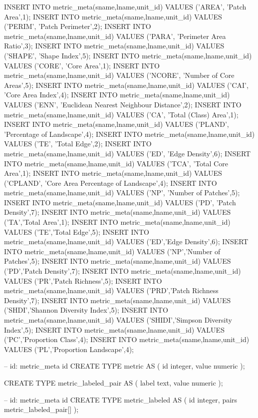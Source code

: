 \begin{SQL}
INSERT INTO metric_meta(sname,lname,unit_id) VALUES ('AREA', 'Patch Area',1);
INSERT INTO metric_meta(sname,lname,unit_id) VALUES ('PERIM', 'Patch Perimeter',2);
INSERT INTO metric_meta(sname,lname,unit_id) VALUES ('PARA', 'Perimeter Area Ratio',3);
INSERT INTO metric_meta(sname,lname,unit_id) VALUES ('SHAPE', 'Shape Index',5);
INSERT INTO metric_meta(sname,lname,unit_id) VALUES ('CORE', 'Core Area',1);
INSERT INTO metric_meta(sname,lname,unit_id) VALUES ('NCORE', 'Number of Core Areas',5);
INSERT INTO metric_meta(sname,lname,unit_id) VALUES ('CAI', 'Core Area Index',4);
INSERT INTO metric_meta(sname,lname,unit_id) VALUES ('ENN', 'Euclidean Nearest Neighbour Distance',2);
INSERT INTO metric_meta(sname,lname,unit_id) VALUES ('CA', 'Total (Class) Area',1);
INSERT INTO metric_meta(sname,lname,unit_id) VALUES ('PLAND', 'Percentage of Landscape',4);
INSERT INTO metric_meta(sname,lname,unit_id) VALUES ('TE', 'Total Edge',2);
INSERT INTO metric_meta(sname,lname,unit_id) VALUES ('ED', 'Edge Density',6);
INSERT INTO metric_meta(sname,lname,unit_id) VALUES ('TCA', 'Total Core Area',1);
INSERT INTO metric_meta(sname,lname,unit_id) VALUES ('CPLAND', 'Core Area Percentage of Landscape',4);
INSERT INTO metric_meta(sname,lname,unit_id) VALUES ('NP', 'Number of Patches',5);
INSERT INTO metric_meta(sname,lname,unit_id) VALUES ('PD', 'Patch Density',7);
INSERT INTO metric_meta(sname,lname,unit_id) VALUES ('TA','Total Area',1);
INSERT INTO metric_meta(sname,lname,unit_id) VALUES ('TE','Total Edge',5);
INSERT INTO metric_meta(sname,lname,unit_id) VALUES ('ED','Edge Density',6);
INSERT INTO metric_meta(sname,lname,unit_id) VALUES ('NP','Number of Patches',5);
INSERT INTO metric_meta(sname,lname,unit_id) VALUES ('PD','Patch Density',7);
INSERT INTO metric_meta(sname,lname,unit_id) VALUES ('PR','Patch Richness',5);
INSERT INTO metric_meta(sname,lname,unit_id) VALUES ('PRD','Patch Richness Density',7);
INSERT INTO metric_meta(sname,lname,unit_id) VALUES ('SHDI','Shannon Diversity Index',5);
INSERT INTO metric_meta(sname,lname,unit_id) VALUES ('SHIDI','Simpson Diversity Index',5);
INSERT INTO metric_meta(sname,lname,unit_id) VALUES ('PC','Proportion Class',4);
INSERT INTO metric_meta(sname,lname,unit_id) VALUES ('PL','Proportion Landscape',4);



-- id: metric_meta id
CREATE TYPE metric AS (
	id integer,
	value numeric
);


CREATE TYPE metric_labeled_pair AS
(
	label text,
	value numeric
);

-- id: metric_meta id
CREATE TYPE metric_labeled AS
(
	id integer,
	pairs metric_labeled_pair[]
);
\end{SQL}
